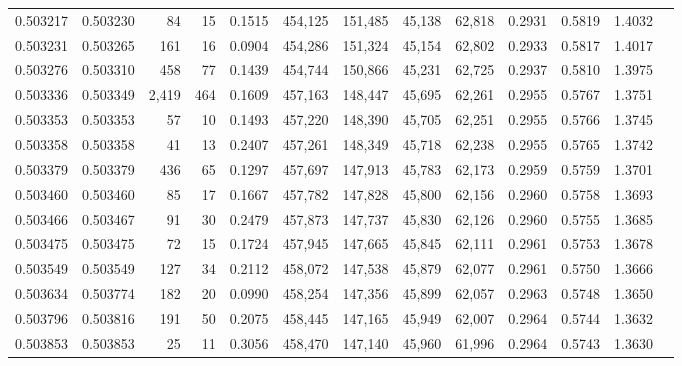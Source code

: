 \begin{tabular}{rrrrrrrrrrrrr}
0.503217 & 0.503230 &    84 &    15 &                                     0.1515 & 454,125 & 151,485 &  45,138 &  62,818 & 0.2931 & 0.5819 & 1.4032 \\
0.503231 & 0.503265 &   161 &    16 &                                     0.0904 & 454,286 & 151,324 &  45,154 &  62,802 & 0.2933 & 0.5817 & 1.4017 \\
0.503276 & 0.503310 &   458 &    77 &                                     0.1439 & 454,744 & 150,866 &  45,231 &  62,725 & 0.2937 & 0.5810 & 1.3975 \\
0.503336 & 0.503349 & 2,419 &   464 &                                     0.1609 & 457,163 & 148,447 &  45,695 &  62,261 & 0.2955 & 0.5767 & 1.3751 \\
0.503353 & 0.503353 &    57 &    10 &                                     0.1493 & 457,220 & 148,390 &  45,705 &  62,251 & 0.2955 & 0.5766 & 1.3745 \\
0.503358 & 0.503358 &    41 &    13 &                                     0.2407 & 457,261 & 148,349 &  45,718 &  62,238 & 0.2955 & 0.5765 & 1.3742 \\
0.503379 & 0.503379 &   436 &    65 &                                     0.1297 & 457,697 & 147,913 &  45,783 &  62,173 & 0.2959 & 0.5759 & 1.3701 \\
0.503460 & 0.503460 &    85 &    17 &                                     0.1667 & 457,782 & 147,828 &  45,800 &  62,156 & 0.2960 & 0.5758 & 1.3693 \\
0.503466 & 0.503467 &    91 &    30 &                                     0.2479 & 457,873 & 147,737 &  45,830 &  62,126 & 0.2960 & 0.5755 & 1.3685 \\
0.503475 & 0.503475 &    72 &    15 &                                     0.1724 & 457,945 & 147,665 &  45,845 &  62,111 & 0.2961 & 0.5753 & 1.3678 \\
0.503549 & 0.503549 &   127 &    34 &                                     0.2112 & 458,072 & 147,538 &  45,879 &  62,077 & 0.2961 & 0.5750 & 1.3666 \\
0.503634 & 0.503774 &   182 &    20 &                                     0.0990 & 458,254 & 147,356 &  45,899 &  62,057 & 0.2963 & 0.5748 & 1.3650 \\
0.503796 & 0.503816 &   191 &    50 &                                     0.2075 & 458,445 & 147,165 &  45,949 &  62,007 & 0.2964 & 0.5744 & 1.3632 \\
0.503853 & 0.503853 &    25 &    11 &                                     0.3056 & 458,470 & 147,140 &  45,960 &  61,996 & 0.2964 & 0.5743 & 1.3630 \\

\end{tabular}
